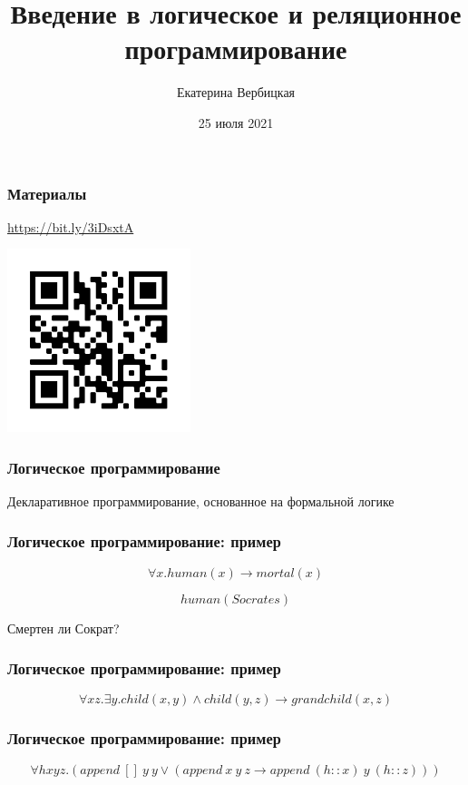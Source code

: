 \documentclass{beamer}
\title[]{Введение в логическое и реляционное программирование}
\subtitle[]{}
\institute[]{
Лаборатория языков инструментов JetBrains\\
}
\author[]{Екатерина Вербицкая}
\date{25 июля 2021}
\begin{document}
{
  \begin{frame}
    \titlepage
  \end{frame}
}

\begin{frame}[fragile]
  \frametitle{Материалы}
\begin{center}
\url{https://bit.ly/3iDsxtA}

\vspace{1cm}

\includegraphics[width=0.4\textwidth]{pics/links.png}
\end{center}
\end{frame}


\begin{frame}[fragile]
  \frametitle{Логическое программирование}
\begin{center}
  Декларативное программирование, основанное на формальной логике
\end{center}
\end{frame}

\begin{frame}[fragile]
  \frametitle{Логическое программирование: пример}
\[
  \forall x. human(x) \to mortal(x)
\]

\[
  human(Socrates)
\]

\vspace{1cm}

\begin{center}
  Смертен ли Сократ?
\end{center}
\end{frame}

\begin{frame}[fragile]
  \frametitle{Логическое программирование: пример}
\[
  \forall x z. \exists y. child (x,y) \wedge child(y,z) \to grandchild(x,z)
\]
\end{frame}

\begin{frame}[fragile]
  \frametitle{Логическое программирование: пример}
\[
  \forall h x y z. (append \ [] \ y \ y \vee (append \ x \ y \ z \to append \ (h :: x) \  y \ (h :: z)))
\]
\end{frame}
\end{document}
